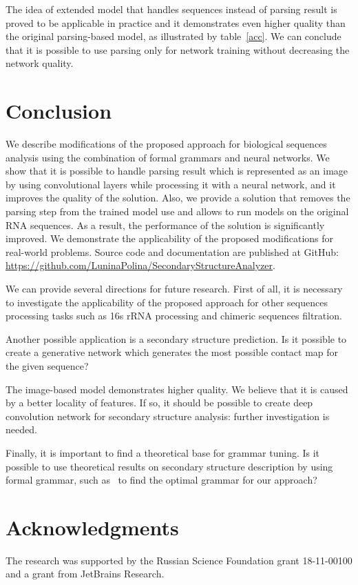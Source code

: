 \documentclass[12pt,a4paper]{cibb}
\begin{document}
The idea of extended model that handles sequences instead of parsing result is proved to be applicable in practice and it demonstrates even higher quality than the original parsing-based model, as illustrated by table~\ref{acc}.
We can conclude that it is possible to use parsing only for network training without decreasing the network quality.

\section{\bf Conclusion}

We describe modifications of the proposed approach for biological sequences analysis using the combination of formal grammars and neural networks.
We show that it is possible to handle parsing result which is represented as an image by using convolutional layers while processing it with a neural network, and it improves the quality of the solution.
Also, we provide a solution that removes the parsing step from the trained model use and allows to run models on the original RNA sequences.
As a result, the performance of the solution is significantly improved.
We demonstrate the applicability of the proposed modifications for real-world problems.
Source code and documentation are published at GitHub: \url{https://github.com/LuninaPolina/SecondaryStructureAnalyzer}.

We can provide several directions for future research.
First of all, it is necessary to investigate the applicability of the proposed approach for other sequences processing tasks such as 16s rRNA processing and chimeric sequences filtration.

Another possible application is a secondary structure prediction.
Is it possible to create a generative network which generates the most possible contact map for the given sequence?

The image-based model demonstrates higher quality.
We believe that it is caused by a better locality of features.
If so, it should be possible to create deep convolution network for secondary structure analysis: further investigation is needed.

Finally, it is important to find a theoretical base for grammar tuning.
Is it possible to use theoretical results on secondary structure description by using formal grammar, such as~\cite{MQbioinformatics19} to find the optimal grammar for our approach?


\section*{\bf Acknowledgments}

The research was supported by the Russian Science Foundation grant 18-11-00100 and a grant from JetBrains Research.



%


{\fontsize{10}{10}\selectfont
\setlength{\parskip}{0pt}



}
\end{document}
